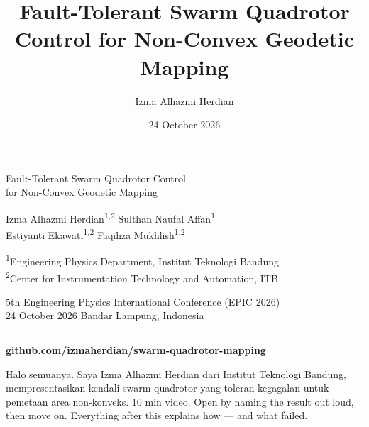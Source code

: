 \documentclass[aspectratio=169,11pt,t]{beamer}
\title{Fault-Tolerant Swarm Quadrotor Control for Non-Convex Geodetic Mapping}
\author{Izma Alhazmi Herdian}
\date{24 October 2026}
\begin{document}
{
\begin{frame}[plain]
  \vskip4mm
  \begin{minipage}{0.92\linewidth}
    {\color{epicwhite}\headfont\fontsize{19}{23}\selectfont
     Fault-Tolerant Swarm Quadrotor Control\\for Non-Convex Geodetic Mapping\par}
  \end{minipage}
  \vskip16mm
  {\color{epicrust}\headfont\small
   Izma Alhazmi Herdian\textsuperscript{1,2}\quad
   Sulthan Naufal Affan\textsuperscript{1}\\[0.6ex]
   Estiyanti Ekawati\textsuperscript{1,2}\quad
   Faqihza Mukhlish\textsuperscript{1,2}\par}
  \vskip2.5mm
  {\color{epicbody}\small
   \textsuperscript{1}Engineering Physics Department, Institut Teknologi Bandung\\
   \textsuperscript{2}Center for Instrumentation Technology and Automation, ITB\par}
  \vskip6mm
  {\color{epicmuted}\small
   5th Engineering Physics International Conference (EPIC 2026)\\
   24 October 2026 \textperiodcentered{} Bandar Lampung, Indonesia\par}
  \vfill
  {\color{epicrule}\rule{\linewidth}{0.4pt}\par}
  \vskip1.5mm
  {\color{epicclay}\bfseries\small github.com/izmaherdian/swarm-quadrotor-mapping\par}
    {Halo semuanya. Saya Izma Alhazmi Herdian dari Institut Teknologi Bandung, mempresentasikan kendali swarm quadrotor yang toleran kegagalan untuk pemetaan area non-konveks.}
    {10 min video. Open by naming the result out loud, then move on.
        Everything after this explains how --- and what failed.}
\end{frame}}
\end{document}
